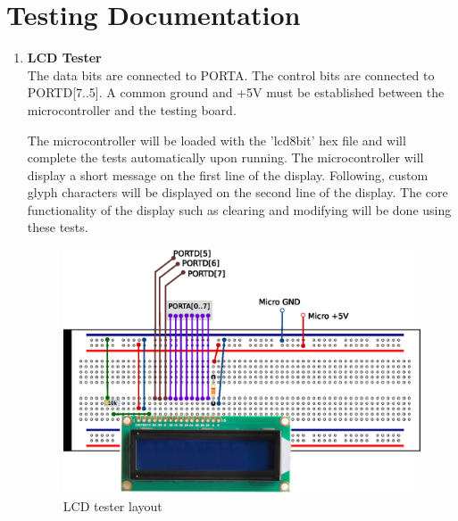 \documentclass[bibtotocnumbered,abstract=on,paper=a4,fontsize=12pt,parskip=on,halfparskip=on]{scrartcl}		%
\begin{document}
\section{Testing Documentation}
  \begin{enumerate}
    \item{\textbf{LCD Tester}}\hfill \\
    The data bits are connected to PORTA. The control bits are connected to PORTD[7..5]. A common ground and +5V must be established between the microcontroller and the testing board.\par

      The microcontroller will be loaded with the 'lcd8bit' hex file and will complete the tests automatically upon running. The microcontroller will display a short message on the first line of the display. Following, custom glyph characters will be displayed on the second line of the display. The core functionality of the display such as clearing and modifying will be done using these tests.
  \begin{figure}[H]
    \centering
      \includegraphics[width=\linewidth]{img/testdoc_lcdtester}
      \caption{LCD tester layout}
  \end{figure}


\end{enumerate}
\end{document}
